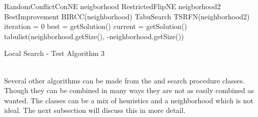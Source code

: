 \IncMargin{1em}
\begin{algorithm}[H]

  \algdata
RandomConflictConNE neigborhood \;
RestrictedFlipNE neigborhood2 \;
BestImprovement BIRCC(neighborhood) \;
TabuSearch TSRFN(neighborhood2) \;
\int iteration = 0 \;
\int[] best = getSolution() \;
\int[] current = getSolution() \;
\int[] tabulist(neighborhood.getSize(), -neighborhood.getSize()) \;
\caption{Local Search - Test Algorithm 3} \label{algo_LS3} 
\end{algorithm} \noindent
\DecMargin{1em} \\
Several other algorithms can be made from the  and search procedure classes. Though they can be 
combined in many ways they are not as easily combined as wanted. The  classes can be a mix of 
heuristics and a neighborhood which is not ideal. The next subsection will discuss this in more detail. 



